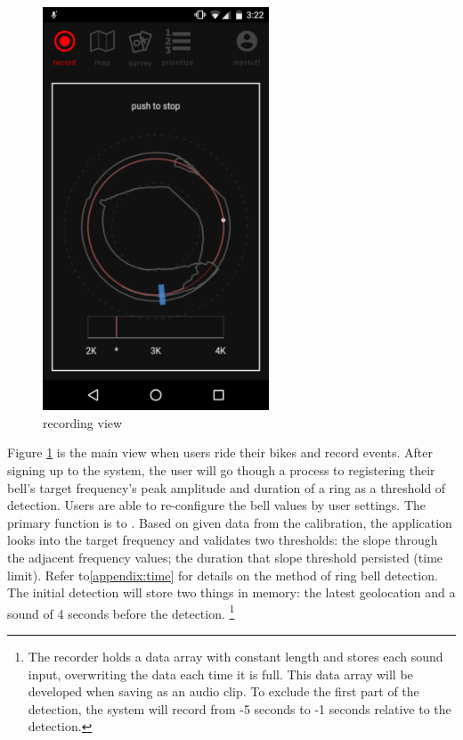 \begin{figure}[!htb]
  \includegraphics[width=0.6\textwidth]{chapters/4/fig/interface_recording.png}
  \caption[interface: Record]{recording view}
  \label{fig:interface_record}
\end{figure}

Figure \ref{fig:interface_record} is the main view when users ride their bikes and record events. After signing up to the system, the user will go though a process to registering their bell's target frequency's peak amplitude and duration of a ring as a threshold of detection. Users are able to re-configure the bell values by user settings. The primary function is to . Based on  given  data  from  the  calibration, the application looks into the target frequency and validates two thresholds: the slope through the adjacent frequency values; the duration that slope threshold persisted (time limit). Refer to\ref{appendix:time} for details on the method of ring bell detection. The initial detection will store two things in memory: the latest geolocation and a sound of 4 seconds before the detection.
\footnote{The recorder holds a data array with constant length and stores each sound input, overwriting the data each time
it is full. This data array will be developed when saving as an audio clip. To exclude the first part of the detection, the system will record from
-5 seconds to -1 seconds relative to the detection.}

